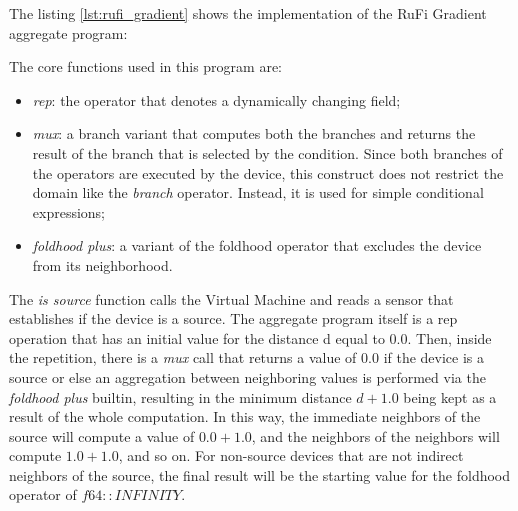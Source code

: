 The listing \ref{lst:rufi_gradient} shows the implementation of the RuFi Gradient aggregate program:



The core functions used in this program are:

\begin{itemize}
    \item \textit{rep}: the operator that denotes a dynamically changing field;
    \item \textit{mux}: a branch variant that computes both the branches and returns the result of the branch that is selected by the condition. Since both branches of the operators
          are executed by the device, this construct does not restrict the domain like the \textit{branch} operator. Instead, it is used for simple conditional expressions;
    \item \textit{foldhood plus}: a variant of the foldhood operator that excludes the device from its neighborhood.
\end{itemize}

The \textit{is source} function calls the Virtual Machine and reads a sensor that establishes if the device is a source.
The aggregate program itself is a rep operation that has an initial value for the distance d equal to $0.0$.
Then, inside the repetition, there is a \textit{mux} call that returns a value of $0.0$ if the device is a source or else an aggregation between neighboring values is performed via the \textit{foldhood plus} builtin, resulting in the minimum distance $d + 1.0$ being kept as a result of the whole computation.
In this way, the immediate neighbors of the source will compute a value of $0.0 + 1.0$, and the neighbors of the neighbors will compute $1.0 + 1.0$, and so on.
For non-source devices that are not indirect neighbors of the source, the final result will be the starting value for the foldhood operator of $f64::INFINITY$.